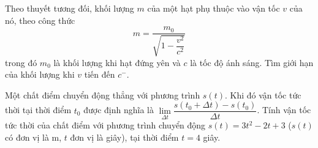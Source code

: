 \begin{vd}%
Theo thuyết tương đối, khối lượng $m$ của một hạt phụ thuộc vào vận tốc $v$ của nó, theo công thức
$$
m=\frac{m_0}{\sqrt{1-\dfrac{v^2}{c^2}}}
$$
trong đó $m_0$ là khối lượng khi hạt đứng yên và $c$ là tốc độ ánh sáng. Tìm giới hạn của khối lượng khi $v$ tiến đến $c^{-}$.
\end{vd}

\begin{vd}%
Một chất điểm chuyển động thẳng với phương trình $s(t)$. Khi đó vận tốc tức thời tại thời điểm $t_0$ được định nghĩa là $\displaystyle \lim \limits_{\Delta t} \dfrac{s(t_0+ \Delta t) - s(t_0)}{\Delta t}$. Tính vận tốc tức thời của chất điểm với phương trình chuyển động $s(t) = 3t^2-2t+3$ ($s(t)$ có đơn vị là m, $t$ đơn vị là giây), tại thời điểm $t=4$ giây. 
\end{vd}

